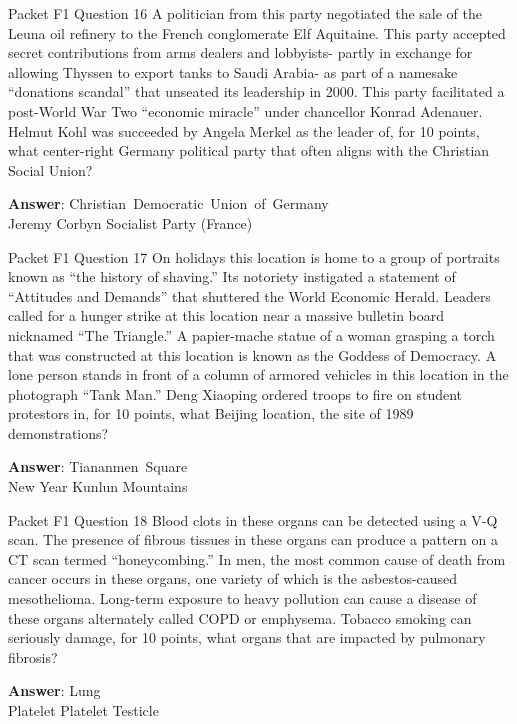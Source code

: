 \begin{frame}{Packet F1 Question 16}
A politician from this party negotiated the   sale of the Leuna oil refinery to the French conglomerate Elf Aquitaine. This party accepted secret contributions from arms dealers and lobbyists- partly in exchange for allowing Thyssen to export tanks to Saudi Arabia- as part of a namesake “donations scandal” that unseated its leadership in 2000. This party facilitated   a post-World War Two “economic miracle” under chancellor Konrad Adenauer. Helmut   Kohl was succeeded by Angela Merkel as the leader of,   for 10 points, what center-right Germany political party that often aligns with the Christian Social Union?  

\textbf{Answer}: Christian\ Democratic\ Union\ of\ Germany\\
 Jeremy Corbyn
 Socialist Party (France)
\end{frame}

\begin{frame}{Packet F1 Question 17}
On holidays this location   is home to a group of portraits known as ``the history of shaving.'' Its notoriety instigated a statement of ``Attitudes and Demands'' that shuttered the World   Economic Herald. Leaders called for a hunger strike at this location near a massive bulletin board nicknamed “The Triangle.” A papier-mache statue of a woman grasping a torch that was constructed at this location is known as the Goddess of Democracy. A lone person stands in front of a column of armored vehicles in this location in the photograph   “Tank Man.” Deng Xiaoping ordered     troops to fire on student protestors in, for 10 points, what Beijing location, the site of 1989 demonstrations?

\textbf{Answer}: Tiananmen\ Square\\
 New Year
 Kunlun Mountains
\end{frame}

\begin{frame}{Packet F1 Question 18}
Blood clots in these organs     can be detected using a V-Q scan. The presence of fibrous tissues in these organs can produce   a pattern on a CT scan termed “honeycombing.” In men, the most common cause of death from cancer occurs   in these organs, one variety of which is the asbestos-caused mesothelioma. Long-term exposure to heavy pollution can cause a disease of   these organs alternately called COPD or emphysema. Tobacco smoking can seriously damage, for 10 points, what organs that are impacted by pulmonary fibrosis?

\textbf{Answer}: Lung\\
 Platelet
 Platelet
 Testicle
\end{frame}

